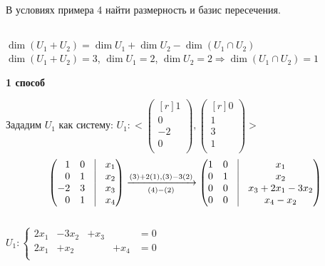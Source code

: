 %

\begin{prim}
В условиях примера 4 найти размерность и базис пересечения.
\end{prim}\\
$\dim  (U_1+U_2)=\dim  U_1+\dim  U_2-\dim (U_1 \cap U_2)$\\
$\dim  (U_1+U_2)=3$, $\dim  U_1=2$, $\dim  U_2=2 \Rightarrow \dim (U_1 \cap U_2)=1$

\vspace{5cm}
\noindent\textbf{1 способ}

Зададим $U_1$ как систему: 
$U_1: <\left(
	\begin{smallmatrix*}[r]
	1\\
	0\\
	-2\\
	0\\
	\end{smallmatrix*}
\right) , \left(
	\begin{smallmatrix*}[r]
	0\\
	1\\
	3\\
	1\\
	\end{smallmatrix*}
\right)>$\\
$$
\begin{pmatrix*}[r]
	1 & 0 & \vrule & x_1\\
	0 & 1 & \vrule & x_2\\
	-2 & 3 & \vrule & x_3\\
	0 & 1 & \vrule & x_4\\
	\end{pmatrix*}
\xrightarrow[(4)-(2)]{ 
	(3)+2(1),
	(3)-3(2)}
\begin{pmatrix*}[c]
	1 & 0 & \vrule & x_1\\
	0 & 1 & \vrule & x_2\\
	0 & 0 & \vrule & x_3+2x_1-3x_2\\
	0 & 0 & \vrule & x_4-x_2\\
	\end{pmatrix*}
$$\\
$
U_1: 
\left\{	
	\begin{array}{rrrrl}
	2x_1 & - 3x_2 & + x_3 & & =0 \\
	2x_1 & + x_2 & & + x_4 & =0 \\
	\end{array}
\right.
$\\
